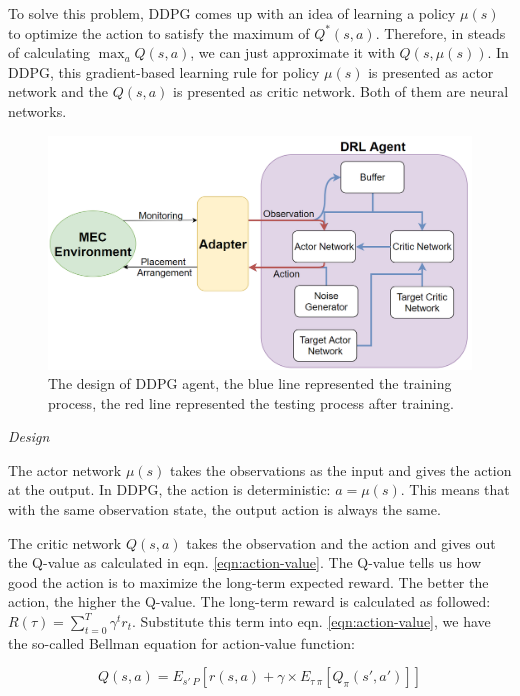 \documentclass[conference]{IEEEtran}
\begin{document}
To solve this problem, DDPG comes up with an idea of learning a policy $\mu(s)$ to optimize the action to satisfy the maximum of $Q^*(s, a)$. Therefore, in steads of calculating $\max_{a} Q(s,a)$, we can just approximate it with $Q(s, \mu(s))$. In DDPG, this gradient-based learning rule for policy $\mu(s)$ is presented as actor network and the $Q(s, a)$ is presented as critic network. Both of them are neural networks.

\begin{figure}[]
    \centering
    \includegraphics[scale = 0.23]{imgs/RL_design.png}
    \caption{The design of DDPG agent, the blue line represented the training process, the red line represented the testing process after training.}
    \label{fig:DDPG_design}
\end{figure}

\textit{Design}

The actor network $\mu(s)$ takes the observations as the input and gives the action at the output. In DDPG, the action is deterministic: $a = \mu(s)$. This means that with the same observation state, the output action is always the same. 

The critic network $Q(s,a)$ takes the observation and the action and gives out the Q-value as calculated in eqn. \ref{eqn:action-value}. The Q-value tells us how good the action is to maximize the long-term expected reward. The better the action, the higher the Q-value. The long-term reward is calculated as followed: $R(\tau) = \sum_{t=0}^{T} \gamma^t r_t$. Substitute this term into eqn. \ref{eqn:action-value}, we have the so-called Bellman equation for action-value function: 

\begin{equation}
    Q(s,a) = E_{s' ~ P} [r(s,a) + \gamma \times E_{\tau ~ \pi}[Q_{\pi}(s', a')]]
\end{equation}
\end{document}
